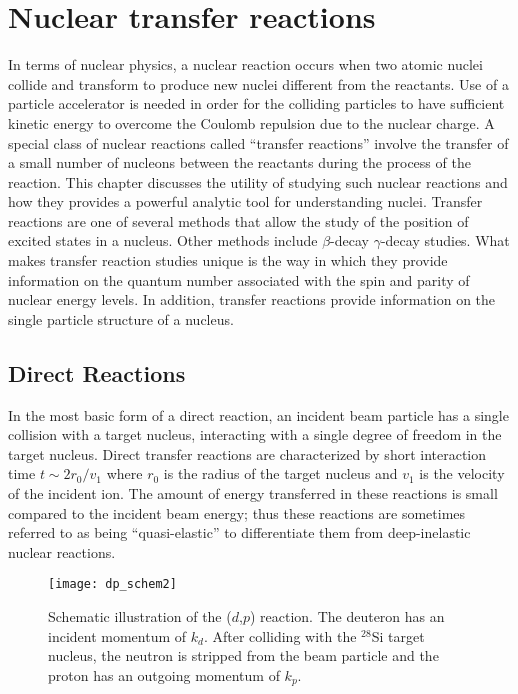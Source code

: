 \chapter{Nuclear transfer reactions}
\label{chapt:reactions}
In terms of nuclear physics, a nuclear reaction occurs when two atomic nuclei collide and transform to produce new nuclei different from the reactants.  Use of a particle accelerator is needed in order for the colliding particles to have sufficient kinetic energy to overcome the Coulomb repulsion due to the nuclear charge.  A special class of nuclear reactions called ``transfer reactions'' involve the transfer of a small number of nucleons between the reactants during the process of the reaction.  This chapter discusses the utility of studying such nuclear reactions and how they provides a powerful analytic tool for understanding  nuclei.  Transfer reactions are one of several methods that allow the study of the position of excited states in a nucleus.  Other methods include $\beta$-decay $\gamma$-decay studies.  What makes transfer reaction studies unique is the way in which they provide information on the quantum number associated with the spin and parity of nuclear energy levels.  In addition, transfer reactions provide information on the single particle structure of a nucleus.

\section{Direct Reactions}
In the most basic form of a direct reaction, an incident beam particle has a single collision with a target nucleus, interacting with a single degree of freedom in the target nucleus.  Direct transfer reactions are characterized by short interaction time $t\sim2r_0/v_1$ where $r_0$ is the radius of the target nucleus and $v_1$ is the velocity of the incident ion.  The amount of energy transferred in these reactions is small compared to the incident beam energy; thus these reactions are sometimes referred to as being  ``quasi-elastic'' to differentiate them from deep-inelastic nuclear reactions. 

\begin{figure}%
\centering
\texttt{[image: dp\_schem2]}%
\caption[Schematic illustration of the ($d$,$p$) reaction]{Schematic illustration of the ($d$,$p$) reaction.  The  deuteron has an incident momentum of $k_d$. After colliding with the $^{28}$Si target nucleus, the neutron is stripped from the beam particle and the proton has an outgoing momentum of $k_p$.}%
\label{dp_fig}%
\end{figure}

